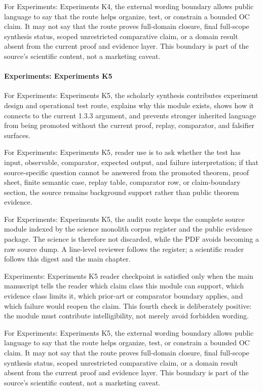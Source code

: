 For Experiments: Experiments K4, the external wording boundary allows public language to say that the route helps organize, test, or constrain a bounded OC claim. It may not say that the route proves full-domain closure, final full-scope synthesis status, scoped unrestricted comparative claim, or a domain result absent from the current proof and evidence layer. This boundary is part of the source's scientific content, not a marketing caveat.


\paragraph{Experiments: Experiments K5}

For Experiments: Experiments K5, the scholarly synthesis contributes experiment design and operational test route, explains why this module exists, shows how it connects to the current 1.3.3 argument, and prevents stronger inherited language from being promoted without the current proof, replay, comparator, and falsifier surfaces.


For Experiments: Experiments K5, reader use is to ask whether the test has input, observable, comparator, expected output, and failure interpretation; if that source-specific question cannot be answered from the promoted theorem, proof sheet, finite semantic case, replay table, comparator row, or claim-boundary section, the source remains background support rather than public theorem evidence.


For Experiments: Experiments K5, the audit route keeps the complete source module indexed by the science monolith corpus register and the public evidence package. The science is therefore not discarded, while the PDF avoids becoming a raw source dump. A line-level reviewer follows the register; a scientific reader follows this digest and the main chapter.


Experiments: Experiments K5 reader checkpoint is satisfied only when the main manuscript tells the reader which claim class this module can support, which evidence class limits it, which prior-art or comparator boundary applies, and which failure would reopen the claim. This fourth check is deliberately positive: the module must contribute intelligibility, not merely avoid forbidden wording.


For Experiments: Experiments K5, the external wording boundary allows public language to say that the route helps organize, test, or constrain a bounded OC claim. It may not say that the route proves full-domain closure, final full-scope synthesis status, scoped unrestricted comparative claim, or a domain result absent from the current proof and evidence layer. This boundary is part of the source's scientific content, not a marketing caveat.


